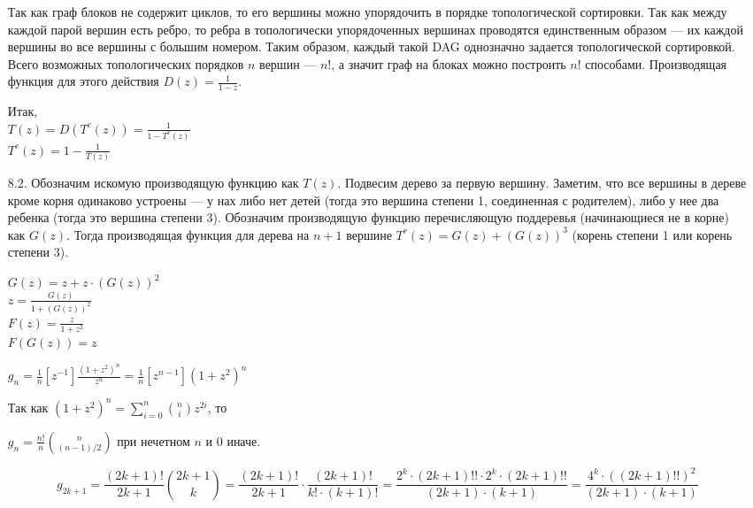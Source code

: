 \documentclass[10pt]{article}
\begin{document}
\begin{enumerate}
	Так как граф блоков не содержит циклов, то его вершины можно упорядочить в порядке топологической сортировки. Так как между каждой парой вершин есть ребро, то ребра в топологически упорядоченных вершинах проводятся единственным образом --- их каждой вершины во все вершины с большим номером. Таким образом, каждый такой DAG однозначно задается топологической сортировкой. Всего возможных топологических порядков $n$ вершин --- $n!$, а значит граф на блоках можно построить $n!$ способами. Производящая функция для этого действия $D(z) = \frac{1}{1 - z}$.
	
	Итак, \\
	$T(z) = D(T^c(z)) = \frac{1}{1 - T^c(z)}$ \\
	$T^c(z) = 1 - \frac{1}{T(z)}$
	
	\item[8.2.] Обозначим искомую производящую функцию как $T(z)$. Подвесим дерево за первую вершину. Заметим, что все вершины в дереве кроме корня одинаково устроены --- у нах либо нет детей (тогда это вершина степени 1, соединенная с родителем), либо у нее два ребенка (тогда это вершина степени 3). Обозначим производящую функцию перечисляющую поддеревья (начинающиеся не в корне) как $G(z)$. Тогда производящая функция для дерева на $n+1$ вершине $T^{r}(z) = G(z) + (G(z))^3$ (корень степени 1 или корень степени 3).
	
	$G(z) = z + z \cdot (G(z))^2$ \\
	$z = \frac{G(z)}{1 + (G(z))^2}$ \\
	$F(z) = \frac{z}{1+z^2}$\\
	$F(G(z)) = z$
	
	$g_n = \frac{1}{n} [ z^{-1} ] \frac{(1+z^2)^n}{z^n} = \frac{1}{n} [z^{n-1}] (1+z^2)^n$
	
	Так как $(1+z^2)^n = \sum_{i=0}^n \binom{n}{i} z^{2i}$, то
	
	$g_n = \frac{n!}{n} \binom{n}{(n-1)/2}$ при нечетном $n$ и 0 иначе.
	
	$$g_{2k+1} = \frac{(2k+1)!}{2k+1} \binom{2k+1}{k} = \frac{(2k+1)!}{2k+1} \cdot \frac{(2k+1)!}{k! \cdot (k+1)!} = \frac{2^k \cdot (2k+1)!! \cdot 2^k \cdot (2k+1)!!}{(2k+1) \cdot (k+1)} = \frac{4^k \cdot ((2k+1)!!)^2}{(2k+1) \cdot (k+1)}$$
	
\end{enumerate}
\end{document}
